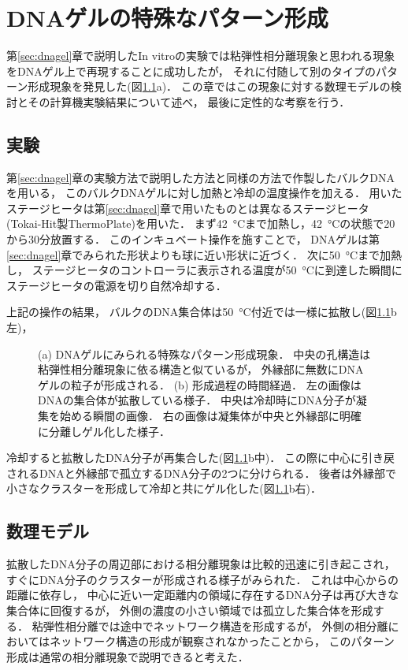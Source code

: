 \chapter{DNAゲルの特殊なパターン形成}

第\ref{sec:dnagel}章で説明したIn vitroの実験では粘弾性相分離現象と思われる現象をDNAゲル上で再現することに成功したが，
それに付随して別のタイプのパターン形成現象を発見した(図\ref{fig:result_special}a)．
この章ではこの現象に対する数理モデルの検討とその計算機実験結果について述べ，
最後に定性的な考察を行う．


\section{実験}
第\ref{sec:dnagel}章の実験方法で説明した方法と同様の方法で作製したバルクDNAを用いる，
このバルクDNAゲルに対し加熱と冷却の温度操作を加える．
用いたステージヒータは第\ref{sec:dnagel}章で用いたものとは異なるステージヒータ
(Tokai-Hit製ThermoPlate)を用いた．
まず\SI{42}{\celsius}まで加熱し，\SI{42}{\celsius}の状態で20から30分放置する．
このインキュベート操作を施すことで，
DNAゲルは第\ref{sec:dnagel}章でみられた形状よりも球に近い形状に近づく．
次に\SI{50}{\celsius}まで加熱し，
ステージヒータのコントローラに表示される温度が\SI{50}{\celsius}に到達した瞬間にステージヒータの電源を切り自然冷却する．

上記の操作の結果，
バルクのDNA集合体は\SI{50}{\celsius}付近では一様に拡散し(図\ref{fig:result_special}b左)，
\begin{figure}
    \centering
    
    \caption{
        (a) DNAゲルにみられる特殊なパターン形成現象．
            中央の孔構造は粘弾性相分離現象に依る構造と似ているが，
            外縁部に無数にDNAゲルの粒子が形成される．
        (b) 形成過程の時間経過．
            左の画像はDNAの集合体が拡散している様子．
            中央は冷却時にDNA分子が凝集を始める瞬間の画像．
            右の画像は凝集体が中央と外縁部に明確に分離しゲル化した様子．
    }
    \label{fig:result_special}
\end{figure}
冷却すると拡散したDNA分子が再集合した(図\ref{fig:result_special}b中)．
この際に中心に引き戻されるDNAと外縁部で孤立するDNA分子の2つに分けられる．
後者は外縁部で小さなクラスターを形成して冷却と共にゲル化した(図\ref{fig:result_special}b右)．


\section{数理モデル}
拡散したDNA分子の周辺部における相分離現象は比較的迅速に引き起こされ，
すぐにDNA分子のクラスターが形成される様子がみられた．
これは中心からの距離に依存し，
中心に近い一定距離内の領域に存在するDNA分子は再び大きな集合体に回復するが，
外側の濃度の小さい領域では孤立した集合体を形成する．
粘弾性相分離では途中でネットワーク構造を形成するが，
外側の相分離においてはネットワーク構造の形成が観察されなかったことから，
このパターン形成は通常の相分離現象で説明できると考えた．

